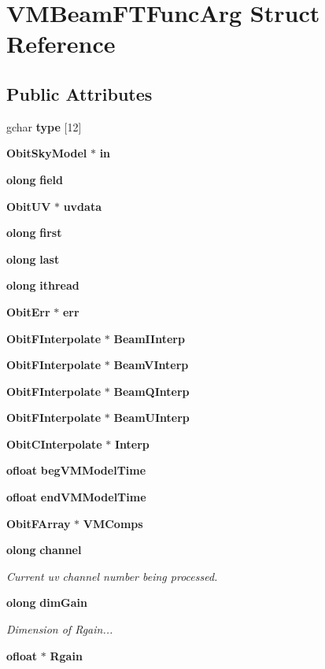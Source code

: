 \section{VMBeam\-FTFunc\-Arg Struct Reference}
\label{structVMBeamFTFuncArg}
\subsection*{Public Attributes}
\begin{CompactItemize}
\item 
gchar {\bf type} [12]
\item 
{\bf Obit\-Sky\-Model} $\ast$ {\bf in}
\item 
{\bf olong} {\bf field}
\item 
{\bf Obit\-UV} $\ast$ {\bf uvdata}
\item 
{\bf olong} {\bf first}
\item 
{\bf olong} {\bf last}
\item 
{\bf olong} {\bf ithread}
\item 
{\bf Obit\-Err} $\ast$ {\bf err}
\item 
{\bf Obit\-FInterpolate} $\ast$ {\bf Beam\-IInterp}
\item 
{\bf Obit\-FInterpolate} $\ast$ {\bf Beam\-VInterp}
\item 
{\bf Obit\-FInterpolate} $\ast$ {\bf Beam\-QInterp}
\item 
{\bf Obit\-FInterpolate} $\ast$ {\bf Beam\-UInterp}
\item 
{\bf Obit\-CInterpolate} $\ast$ {\bf Interp}
\item 
{\bf ofloat} {\bf beg\-VMModel\-Time}
\item 
{\bf ofloat} {\bf end\-VMModel\-Time}
\item 
{\bf Obit\-FArray} $\ast$ {\bf VMComps}
\item 
{\bf olong} {\bf channel}
\begin{CompactList}\small\item\em Current uv channel number being processed. \item\end{CompactList}\item 
{\bf olong} {\bf dim\-Gain}
\begin{CompactList}\small\item\em Dimension of Rgain... \item\end{CompactList}\item 
{\bf ofloat} $\ast$ {\bf Rgain}

\end{CompactItemize}
